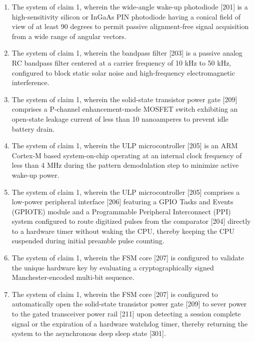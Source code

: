 \documentclass[12pt,a4paper]{article}
\begin{document}
\begin{enumerate}
    \item The system of claim 1, wherein the wide-angle wake-up photodiode [201] is a high-sensitivity silicon or InGaAs PIN photodiode having a conical field of view of at least 90 degrees to permit passive alignment-free signal acquisition from a wide range of angular vectors.

    \item The system of claim 1, wherein the bandpass filter [203] is a passive analog RC bandpass filter centered at a carrier frequency of 10 kHz to 50 kHz, configured to block static solar noise and high-frequency electromagnetic interference.

    \item The system of claim 1, wherein the solid-state transistor power gate [209] comprises a P-channel enhancement-mode MOSFET switch exhibiting an open-state leakage current of less than 10 nanoamperes to prevent idle battery drain.

    \item The system of claim 1, wherein the ULP microcontroller [205] is an ARM Cortex-M based system-on-chip operating at an internal clock frequency of less than 4 MHz during the pattern demodulation step to minimize active wake-up power.

    \item The system of claim 1, wherein the ULP microcontroller [205] comprises a low-power peripheral interface [206] featuring a GPIO Tasks and Events (GPIOTE) module and a Programmable Peripheral Interconnect (PPI) system configured to route digitized pulses from the comparator [204] directly to a hardware timer without waking the CPU, thereby keeping the CPU suspended during initial preamble pulse counting.

    \item The system of claim 1, wherein the FSM core [207] is configured to validate the unique hardware key by evaluating a cryptographically signed Manchester-encoded multi-bit sequence.

    \item The system of claim 1, wherein the FSM core [207] is configured to automatically open the solid-state transistor power gate [209] to sever power to the gated transceiver power rail [211] upon detecting a session complete signal or the expiration of a hardware watchdog timer, thereby returning the system to the asynchronous deep sleep state [301].


\end{enumerate}
\end{document}
